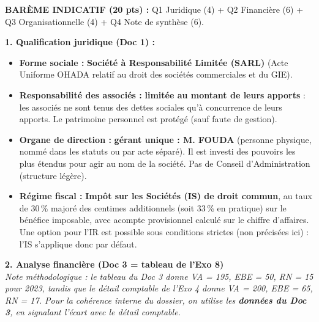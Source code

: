 \documentclass[11pt]{article}
\begin{document}
\begin{corrige}
\textbf{BARÈME INDICATIF (20 pts) :} Q1 Juridique (4) + Q2 Financière (6) + Q3 Organisationnelle (4) + Q4 Note de synthèse (6).

\textbf{1. Qualification juridique (Doc 1) :}
\begin{itemize}
    \item \textbf{Forme sociale :} \textbf{Société à Responsabilité Limitée (SARL)} (Acte Uniforme OHADA relatif au droit des sociétés commerciales et du GIE).
    \item \textbf{Responsabilité des associés :} \textbf{limitée au montant de leurs apports} : les associés ne sont tenus des dettes sociales qu'à concurrence de leurs apports. Le patrimoine personnel est protégé (sauf faute de gestion).
    \item \textbf{Organe de direction :} \textbf{gérant unique : M. FOUDA} (personne physique, nommé dans les statuts ou par acte séparé). Il est investi des pouvoirs les plus étendus pour agir au nom de la société. Pas de Conseil d'Administration (structure légère).
    \item \textbf{Régime fiscal :} \textbf{Impôt sur les Sociétés (IS) de droit commun}, au taux de 30\,\% majoré des centimes additionnels (soit 33\,\% en pratique) sur le bénéfice imposable, avec acompte provisionnel calculé sur le chiffre d'affaires. Une option pour l'IR est possible sous conditions strictes (non précisées ici) : l'IS s'applique donc par défaut.
\end{itemize}

\textbf{2. Analyse financière (Doc 3 = tableau de l'Exo 8)} \\
\textit{Note méthodologique : le tableau du Doc 3 donne VA = 195, EBE = 50, RN = 15 pour 2023, tandis que le détail comptable de l'Exo 4 donne VA = 200, EBE = 65, RN = 17. Pour la cohérence interne du dossier, on utilise les \textbf{données du Doc 3}, en signalant l'écart avec le détail comptable.}


\end{corrige}
\end{document}
